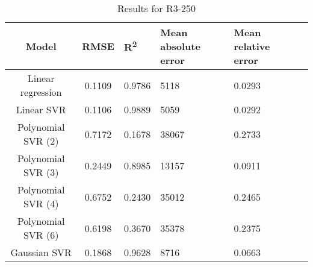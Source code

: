 \begin{table}[H]
\centering
\begin{adjustbox}{center}
\begin{tabular}{c | c M{1.2cm} M{2.5cm} M{2.5cm} M{1.8cm}}
Model & RMSE & R\textsuperscript{2} & Mean absolute error & Mean relative error \tabularnewline
\hline
Linear regression & 0.1109 & 0.9786 &   5118 & 0.0293 \\
Linear SVR & 0.1106 & 0.9889 &   5059 & 0.0292 \\
Polynomial SVR (2) & 0.7172 & 0.1678 &  38067 & 0.2733 \\
Polynomial SVR (3) & 0.2449 & 0.8985 &  13157 & 0.0911 \\
Polynomial SVR (4) & 0.6752 & 0.2430 &  35012 & 0.2465 \\
Polynomial SVR (6) & 0.6198 & 0.3670 &  35378 & 0.2375 \\
Gaussian SVR & 0.1868 & 0.9628 &   8716 & 0.0663 \\
\end{tabular}
\end{adjustbox}
\\
\caption{Results for R3-250}
\label{tab:coreonly_linear_R3_250}
\end{table}
